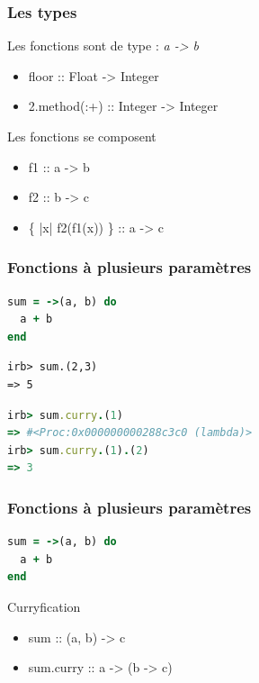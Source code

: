\documentclass{beamer}
\begin{document}
\begin{frame}
\frametitle{Les types}
\begin{block}{Les fonctions sont de type : \emph{a -> b}}
\begin{itemize}
\item floor           :: Float -> Integer
\item 2.method(:+)    :: Integer -> Integer
\end{itemize}
\end{block}
\begin{block}{Les fonctions se composent}
\begin{itemize}
\item f1 :: a -> b
\item f2 :: b -> c
\item \{ |x| f2(f1(x)) \} :: a -> c
\end{itemize}
\end{block}
\end{frame}

\begin{frame}[fragile]
\frametitle{Fonctions à plusieurs paramètres}
\begin{block}{}
\begin{lstlisting}[language=ruby,basicstyle=\ttfamily,keywordstyle=\color{red}]
sum = ->(a, b) do
  a + b
end
\end{lstlisting}
\end{block}
\pause
\begin{block}{}
\begin{lstlisting}
irb> sum.(2,3)
=> 5
\end{lstlisting}
\end{block}
\pause
\begin{block}{}
\begin{lstlisting}[language=ruby,basicstyle=\ttfamily,keywordstyle=\color{red}]
irb> sum.curry.(1)
=> #<Proc:0x000000000288c3c0 (lambda)>
irb> sum.curry.(1).(2)
=> 3
\end{lstlisting}
\end{block}
\end{frame}

\begin{frame}[fragile]
\frametitle{Fonctions à plusieurs paramètres}
\begin{block}{}
\begin{lstlisting}[language=ruby,basicstyle=\ttfamily,keywordstyle=\color{red}]
sum = ->(a, b) do
  a + b
end
\end{lstlisting}
\end{block}
\begin{block}{Curryfication}
\begin{itemize}
\item sum :: (a, b) -> c
\item sum.curry :: a -> (b -> c)
\end{itemize}
\end{block}
\end{frame}
\end{document}
